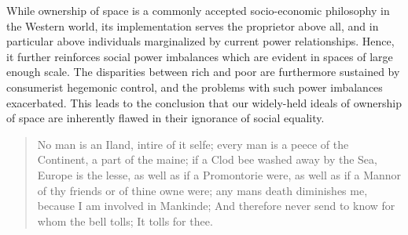 \documentclass[12pt, letterpaper, oneside]{article}
\begin{document}
While ownership of space is a commonly accepted socio-economic philosophy in the Western world, its implementation serves the proprietor above all, and in particular above individuals marginalized by current power relationships. Hence, it further reinforces social power imbalances which are evident in spaces of large enough scale. The disparities between rich and poor are furthermore sustained by consumerist hegemonic control, and the problems with such power imbalances exacerbated. This leads to the conclusion that our widely-held ideals of ownership of space are inherently flawed in their ignorance of social equality.


\begin{quote}
No man is an Iland, intire of it selfe; every man is a peece of the Continent, a part of the maine; if a Clod bee washed away by the Sea, Europe is the lesse, as well as if a Promontorie were, as well as if a Mannor of thy friends or of thine owne were; any mans death diminishes me, because I am involved in Mankinde; And therefore never send to know for whom the bell tolls; It tolls for thee.
\end{quote}

\clearpage
\printbibliography
\end{document}
